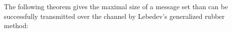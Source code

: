 \documentclass[conference]{IEEEtran}
\newtheorem{Remark}{Remark}
\begin{document}
The following theorem gives the maximal size of a message set than can be successfully transmitted over the channel by Lebedev's generalized rubber method:
\end{document}
